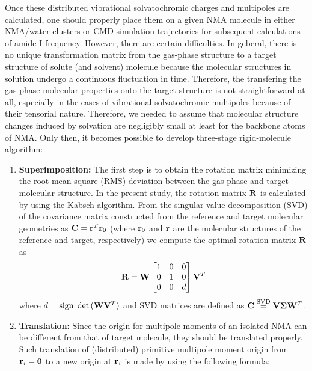 \documentclass[a4paper,titlepage,twoside,fleqn,12pt]{book}
\newcommand{\BM}[1]{\bm{#1}}
\begin{document}
\begin{refsection}
Once these distributed vibrational solvatochromic
charges and multipoles are calculated, one should properly
place them on a given NMA molecule in either NMA/water
clusters or CMD simulation trajectories for subsequent calculations
of amide I frequency. However, there are certain
difficulties. In geberal, there is no unique transformation matrix from the gas\hyp{}phase
structure to a target structure of solute (and solvent) molecule
because the molecular structures in solution
undergo a continuous fluctuation in time.
Therefore, the transfering the gas\hyp{}phase molecular
properties onto the target structure
is not straightforward at all, especially in the cases of vibrational
solvatochromic multipoles because of their tensorial nature.
Therefore, we needed to assume that molecular
structure changes induced by solvation are negligibly small
at least for the backbone atoms of NMA. Only then, it
becomes possible to develop three\hyp{}stage rigid\hyp{}molecule
algorithm:
%
\begin{enumerate}
 \item {\bf Superimposition:} The first step is to obtain
the rotation matrix minimizing the root mean square (RMS) deviation
between the gas\hyp{}phase and target molecular structure. 
In the present study, the rotation matrix $\bf R$ is calculated
by using the Kabsch algorithm. From the singular value decomposition
(SVD) of the covariance matrix constructed from the reference and target
molecular geometries as ${\bf C} = {\bf r}^T {\bf r}_0$ (where ${\bf r}_0$
and ${\bf r}$ are
the molecular structures of the reference and target, respectively) we compute
the optimal rotation matrix $\bf R$ as
 \begin{equation}
  {\bf R} = {\bf W} 
 \begin{bmatrix}
1  & 0 & 0\\ 
0  & 1 & 0\\ 
0  & 0 & d
\end{bmatrix}
  {\bf V}^T
 \end{equation}
where $d={\rm sign}\;\det{({\bf W}{\bf V}^T)}$ and SVD matrices are defined as 
${\bf C}\overset{{\rm SVD}}{=} {\bf V}{\BM \Sigma}{\bf W}^T$.
 \item {\bf Translation:} Since the origin for multipole moments
of an isolated NMA can be different from that of
target molecule, they should be translated properly. Such
translation of (distributed) primitive multipole moment
origin from ${\bf r}_i = {\bf 0}$ to a new origin at ${\bf r}_i$ is made by using
the following formula:
 \begin{equation}

\end{equation}
\end{enumerate}
\end{refsection}
\end{document}
